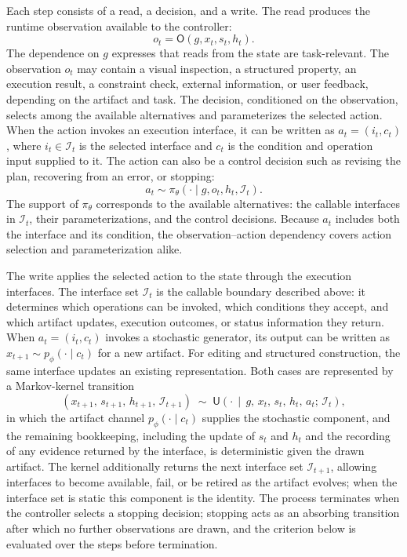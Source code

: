 Each step consists of a read, a decision, and a write. The read produces the runtime observation available to the controller:
\begin{equation}
  o_t = \mathsf{O}(g,x_t,s_t,h_t).
\end{equation}
The dependence on $g$ expresses that reads from the state are task-relevant. The observation $o_t$ may contain a visual inspection, a structured property, an execution result, a constraint check, external information, or user feedback, depending on the artifact and task. The decision, conditioned on the observation, selects among the available alternatives and parameterizes the selected action. When the action invokes an execution interface, it can be written as $a_t=(i_t,c_t)$, where $i_t\in\mathcal{I}_t$ is the selected interface and $c_t$ is the condition and operation input supplied to it. The action can also be a control decision such as revising the plan, recovering from an error, or stopping:
\begin{equation}
  a_t \sim \pi_{\theta}\!\left(\cdot \mid g,o_t,h_t,\mathcal{I}_t\right).
\end{equation}
The support of $\pi_{\theta}$ corresponds to the available alternatives: the callable interfaces in $\mathcal{I}_t$, their parameterizations, and the control decisions. Because $a_t$ includes both the interface and its condition, the observation--action dependency covers action selection and parameterization alike.

The write applies the selected action to the state through the execution interfaces. The interface set $\mathcal{I}_t$ is the callable boundary described above: it determines which operations can be invoked, which conditions they accept, and which artifact updates, execution outcomes, or status information they return. When $a_t=(i_t,c_t)$ invokes a stochastic generator, its output can be written as $x_{t+1}\sim p_{\phi}(\cdot\mid c_t)$ for a new artifact. For editing and structured construction, the same interface updates an existing representation. Both cases are represented by a Markov-kernel transition
\begin{equation}
  (x_{t+1},\,s_{t+1},\,h_{t+1},\,\mathcal{I}_{t+1})
  \;\sim\;
  \mathsf{U}\!\left(\cdot\,\middle|\,g,\,x_t,\,s_t,\,h_t,\,a_t;\,\mathcal{I}_t\right),
\end{equation}
in which the artifact channel $p_{\phi}(\cdot\mid c_t)$ supplies the stochastic component, and the remaining bookkeeping, including the update of $s_t$ and $h_t$ and the recording of any evidence returned by the interface, is deterministic given the drawn artifact. The kernel additionally returns the next interface set $\mathcal{I}_{t+1}$, allowing interfaces to become available, fail, or be retired as the artifact evolves; when the interface set is static this component is the identity. The process terminates when the controller selects a stopping decision; stopping acts as an absorbing transition after which no further observations are drawn, and the criterion below is evaluated over the steps before termination.

